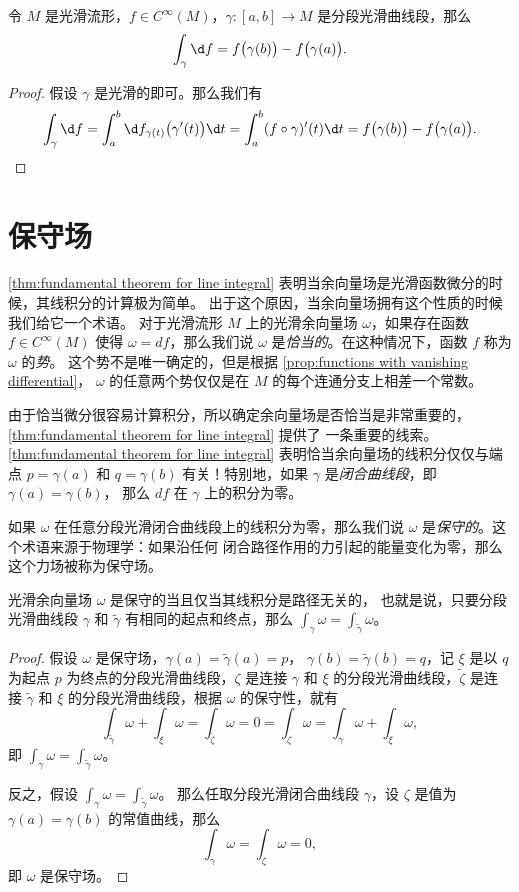 \documentclass[fontset=none]{Notes}
\begin{document}
\begin{theorem}[线积分基本定理]\label{thm:fundamental theorem for line integral}
  令 $M$ 是光滑流形，$f\in C^\infty(M)$，$\gamma:[a,b]\to M$
  是分段光滑曲线段，那么
  \[
    \int_\gamma \d f =f\bigl(\gamma(b)\bigr)-
    f\bigl(\gamma(a)\bigr).
  \]
\end{theorem}
\begin{proof}
  假设 $\gamma$ 是光滑的即可。那么我们有
  \[
    \int_\gamma \d f =
    \int_a^b \d f_{\gamma(t)}\bigl(\gamma'(t)\bigr)\d t
    =\int_a^b (f\circ\gamma)'(t)\d t
    =f\bigl(\gamma(b)\bigr)-
    f\bigl(\gamma(a)\bigr).\qedhere
  \]
\end{proof}

\section{保守场}

\autoref{thm:fundamental theorem for line integral} 
表明当余向量场是光滑函数微分的时候，其线积分的计算极为简单。
出于这个原因，当余向量场拥有这个性质的时候我们给它一个术语。
对于光滑流形 $M$ 上的光滑余向量场 $\omega$，如果存在函数
$f\in C^\infty(M)$ 使得 $\omega=df$，那么我们说 $\omega$
是\emph{恰当的}。在这种情况下，函数 $f$ 称为 $\omega$ 的\emph{势}。
这个势不是唯一确定的，但是根据 \autoref{prop:functions with vanishing differential}，
$\omega$ 的任意两个势仅仅是在 $M$ 的每个连通分支上相差一个常数。

由于恰当微分很容易计算积分，所以确定余向量场是否恰当是非常重要的，
\autoref{thm:fundamental theorem for line integral} 提供了
一条重要的线索。\autoref{thm:fundamental theorem for line integral}
表明恰当余向量场的线积分仅仅与端点 $p=\gamma(a)$ 和 $q=\gamma(b)$
有关！特别地，如果 $\gamma$ 是\emph{闭合曲线段}，即 $\gamma(a)=\gamma(b)$，
那么 $df$ 在 $\gamma$ 上的积分为零。

如果 $\omega$ 在任意分段光滑闭合曲线段上的线积分为零，那么我们说
$\omega$ 是\emph{保守的}。这个术语来源于物理学：如果沿任何
闭合路径作用的力引起的能量变化为零，那么这个力场被称为保守场。

\begin{proposition}
  光滑余向量场 $\omega$ 是保守的当且仅当其线积分是路径无关的，
  也就是说，只要分段光滑曲线段 $\gamma$ 和 $\tilde{\gamma}$
  有相同的起点和终点，那么 $\int_\gamma\omega=\int_{\tilde{\gamma}}\omega$。
\end{proposition}
\begin{proof}
  假设 $\omega$ 是保守场，$\gamma(a)=\tilde{\gamma}(a)=p$，
  $\gamma(b)=\tilde{\gamma}(b)=q$，记 $\xi$ 是以 $q$ 为起点
  $p$ 为终点的分段光滑曲线段，$\zeta$ 是连接 $\gamma$ 和
  $\xi$ 的分段光滑曲线段，$\tilde\zeta$ 是连接 $\tilde\gamma$ 和
  $\xi$ 的分段光滑曲线段，根据 $\omega$ 的保守性，就有
  \[
    \int_{\tilde\gamma}\omega+\int_{\xi}\omega=\int_{\tilde{\zeta}}\omega=0=\int_{\zeta}\omega=\int_{\gamma}\omega+\int_{\xi}\omega,  
  \]
  即 $\int_\gamma\omega=\int_{\tilde\gamma}\omega$。

  反之，假设 $\int_\gamma\omega=\int_{\tilde{\gamma}}\omega$。
  那么任取分段光滑闭合曲线段 $\gamma$，设 $\zeta$ 是值为 $\gamma(a)=\gamma(b)$
  的常值曲线，那么 
  \[
    \int_\gamma\omega=\int_\zeta\omega=0,  
  \]
  即 $\omega$ 是保守场。
\end{proof}
\end{document}
